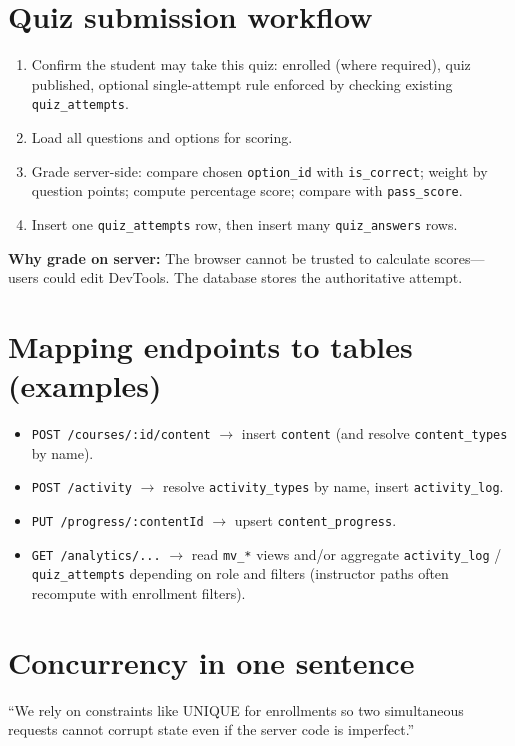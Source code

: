 \section{Quiz submission workflow}
\begin{enumerate}[leftmargin=*]
  \item Confirm the student may take this quiz: enrolled (where required), quiz published, optional single-attempt rule enforced by checking existing \texttt{quiz\_attempts}.

  \item Load all questions and options for scoring.

  \item Grade server-side: compare chosen \texttt{option\_id} with \texttt{is\_correct}; weight by question points; compute percentage score; compare with \texttt{pass\_score}.

  \item Insert one \texttt{quiz\_attempts} row, then insert many \texttt{quiz\_answers} rows.

\end{enumerate}

\textbf{Why grade on server:} The browser cannot be trusted to calculate scores---users could edit DevTools. The database stores the authoritative attempt.

\section{Mapping endpoints to tables (examples)}
\begin{itemize}[leftmargin=*]
  \item \texttt{POST /courses/:id/content} $\rightarrow$ insert \texttt{content} (and resolve \texttt{content\_types} by name).

  \item \texttt{POST /activity} $\rightarrow$ resolve \texttt{activity\_types} by name, insert \texttt{activity\_log}.

  \item \texttt{PUT /progress/:contentId} $\rightarrow$ upsert \texttt{content\_progress}.

  \item \texttt{GET /analytics/...} $\rightarrow$ read \texttt{mv\_*} views and/or aggregate \texttt{activity\_log} / \texttt{quiz\_attempts} depending on role and filters (instructor paths often recompute with enrollment filters).
\end{itemize}

\section{Concurrency in one sentence}
``We rely on constraints like UNIQUE for enrollments so two simultaneous requests cannot corrupt state even if the server code is imperfect.''
